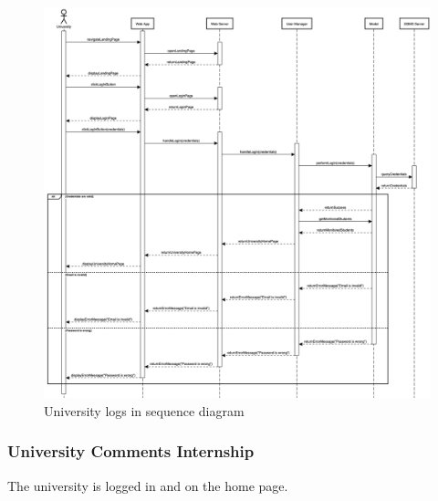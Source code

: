 \begin{figure}[h]
    \centering
    \includegraphics[width=16cm]{images/sequence-diagrams/university-logs-in.png}
    \caption{University logs in sequence diagram}
\end{figure}

\clearpage
\subsubsection{University Comments Internship}
The university is logged in and on the home page.

